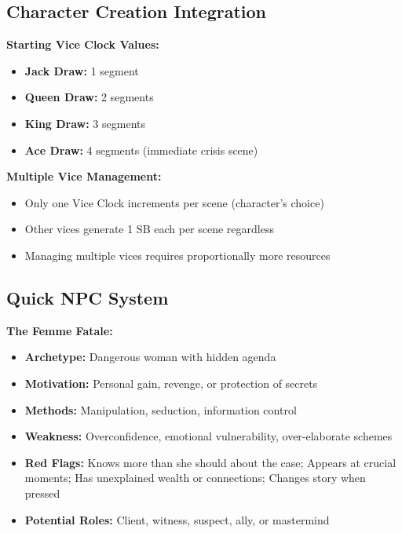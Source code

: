 \documentclass[11pt]{article}
\begin{document}
\subsection{Character Creation Integration}

\textbf{Starting Vice Clock Values:}
\begin{itemize}
    \item \textbf{Jack Draw:} 1 segment
    \item \textbf{Queen Draw:} 2 segments
    \item \textbf{King Draw:} 3 segments  
    \item \textbf{Ace Draw:} 4 segments (immediate crisis scene)
\end{itemize}

\textbf{Multiple Vice Management:}
\begin{itemize}
    \item Only one Vice Clock increments per scene (character's choice)
    \item Other vices generate 1 SB each per scene regardless
    \item Managing multiple vices requires proportionally more resources
\end{itemize}

\subsection{Quick NPC System}

\textbf{The Femme Fatale:}
\begin{itemize}
    \item \textbf{Archetype:} Dangerous woman with hidden agenda
    \item \textbf{Motivation:} Personal gain, revenge, or protection of secrets
    \item \textbf{Methods:} Manipulation, seduction, information control
    \item \textbf{Weakness:} Overconfidence, emotional vulnerability, over-elaborate schemes
    \item \textbf{Red Flags:} Knows more than she should about the case; Appears at crucial moments; Has unexplained wealth or connections; Changes story when pressed
    \item \textbf{Potential Roles:} Client, witness, suspect, ally, or mastermind
\end{itemize}
\end{document}
